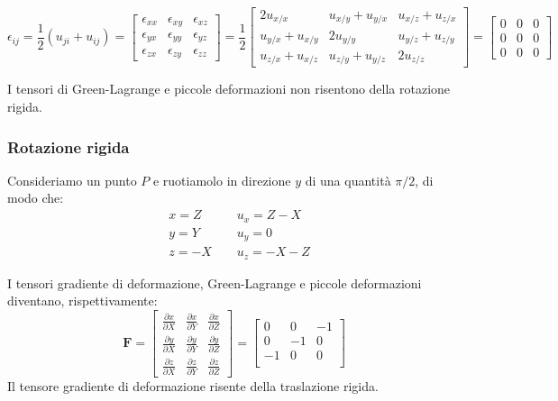 \begin{equation*}
\epsilon_{ij} = \frac{1}{2} \left( u_{ji} + u_{ij} \right)
= 
\begin{bmatrix}
\epsilon_{xx} & \epsilon_{xy} & \epsilon_{xz} \\
\epsilon_{yx} & \epsilon_{yy} & \epsilon_{yz} \\
\epsilon_{zx} & \epsilon_{zy} & \epsilon_{zz}
\end{bmatrix}
= 
\frac{1}{2}
\begin{bmatrix}
2 u_{x/x} & u_{x/y} + u_{y/x} & u_{x/z} + u_{z/x} \\
u_{y/x} + u_{x/y} & 2 u_{y/y} & u_{y/z} + u_{z/y} \\
u_{z/x} + u_{x/z} & u_{z/y} + u_{y/z} & 2 u_{z/z}
\end{bmatrix}
=
\begin{bmatrix}
0 & 0 & 0 \\
0 & 0 & 0 \\
0 & 0 & 0
\end{bmatrix}
\end{equation*}



I tensori di Green-Lagrange e piccole deformazioni non risentono della rotazione rigida.

\subsubsection*{Rotazione rigida}


Consideriamo un punto $P$ e ruotiamolo in direzione $y$ di una quantità $\pi/ 2$, di modo che:
\begin{align*}
    &x = Z \quad\quad &u_x = Z-X\\
    &y = Y    &   u_y = 0\\
    &z = -X &u_z = -X-Z
\end{align*}

I tensori gradiente di deformazione, Green-Lagrange e piccole deformazioni diventano, rispettivamente: 
\begin{equation*}
\boldsymbol{F} = 
\begin{bmatrix}
\frac{\partial x}{\partial X} & \frac{\partial x}{\partial Y} & \frac{\partial x}{\partial Z} \\
\frac{\partial y}{\partial X} & \frac{\partial y}{\partial Y} & \frac{\partial y}{\partial Z} \\
\frac{\partial z}{\partial X} & \frac{\partial z}{\partial Y} & \frac{\partial z}{\partial Z}
\end{bmatrix} = 
\begin{bmatrix}
   0 & 0 & -1 \\
   0 & -1 & 0 \\
   -1 & 0 & 0 \\
\end{bmatrix}
\end{equation*}
Il tensore gradiente di deformazione risente della traslazione rigida.




